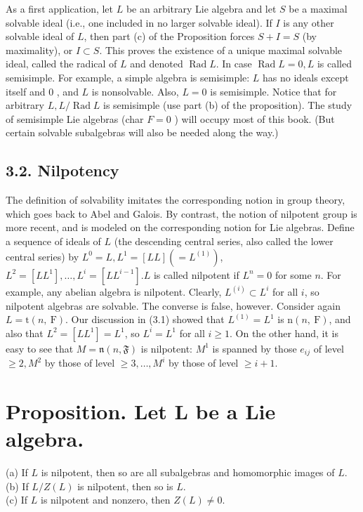 \documentclass[10pt]{article}
\begin{document}
As a first application, let $L$ be an arbitrary Lie algebra and let $S$ be a maximal solvable ideal (i.e., one included in no larger solvable ideal). If $I$ is any other solvable ideal of $L$, then part (c) of the Proposition forces $S+I=S$ (by maximality), or $I \subset S$. This proves the existence of a unique maximal solvable ideal, called the radical of $L$ and denoted $\operatorname{Rad} L$. In case $\operatorname{Rad} L=0, L$ is called semisimple. For example, a simple algebra is semisimple: $L$ has no ideals except itself and 0 , and $L$ is nonsolvable. Also, $L=0$ is semisimple. Notice that for arbitrary $L, L / \operatorname{Rad} L$ is semisimple (use part (b) of the proposition). The study of semisimple Lie algebras (char $F=0$ ) will occupy most of this book. (But certain solvable subalgebras will also be needed along the way.)

\subsection*{3.2. Nilpotency}
The definition of solvability imitates the corresponding notion in group theory, which goes back to Abel and Galois. By contrast, the notion of nilpotent group is more recent, and is modeled on the corresponding notion for Lie algebras. Define a sequence of ideals of $L$ (the descending central series, also called the lower central series) by $L^{0}=L, L^{1}=[L L]\left(=L^{(1)}\right)$, $L^{2}=\left[L L^{1}\right], \ldots, L^{i}=\left[L L^{i-1}\right] . L$ is called nilpotent if $L^{n}=0$ for some $n$. For example, any abelian algebra is nilpotent. Clearly, $L^{(i)} \subset L^{i}$ for all $i$, so\\
nilpotent algebras are solvable. The converse is false, however. Consider again $L=\mathrm{t}(n, \mathrm{~F})$. Our discussion in (3.1) showed that $L^{(1)}=L^{1}$ is $\mathrm{n}(n, \mathrm{~F})$, and also that $L^{2}=\left[L L^{1}\right]=L^{1}$, so $L^{i}=L^{1}$ for all $i \geq 1$. On the other hand, it is easy to see that $M=\mathfrak{n}(n, \mathfrak{F})$ is nilpotent: $M^{1}$ is spanned by those $e_{i j}$ of level $\geq 2, M^{2}$ by those of level $\geq 3, \ldots, M^{i}$ by those of level $\geq i+1$.

\section*{Proposition. Let L be a Lie algebra.}
(a) If $L$ is nilpotent, then so are all subalgebras and homomorphic images of $L$.\\
(b) If $L / Z(L)$ is nilpotent, then so is $L$.\\
(c) If $L$ is nilpotent and nonzero, then $Z(L) \neq 0$.
\end{document}
